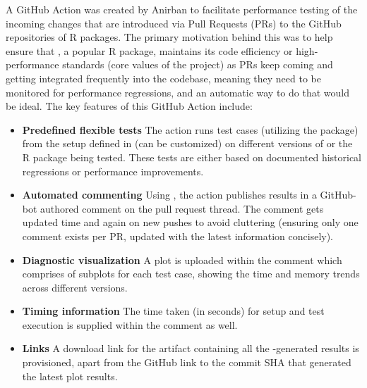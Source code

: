 A GitHub Action was created by Anirban to facilitate performance testing of the incoming changes that are introduced via Pull Requests (PRs) to the GitHub repositories of R packages. The primary motivation behind this was to help ensure that , a popular R package, maintains its code efficiency or high-performance standards (core values of the project) as PRs keep coming and getting integrated frequently into the codebase, meaning they need to be monitored for performance regressions, and an automatic way to do that would be ideal.
\newline
\newline
The key features of this GitHub Action include:
\begin{itemize}
    \item \textbf{Predefined flexible tests} 
    \newline
    The action runs test cases (utilizing the  package) from the setup defined in  (can be customized) on different versions of  or the R package being tested. These tests are either based on documented historical regressions or performance improvements.
    \item \textbf{Automated commenting}
    \newline
    Using , the action publishes results in a GitHub-bot authored comment on the pull request thread. The comment gets updated time and again on new pushes to avoid cluttering (ensuring only one comment exists per PR, updated with the latest information concisely). 
    \item \textbf{Diagnostic visualization}
    \newline
    A plot is uploaded within the comment which comprises of subplots for each test case, showing the time and memory trends across different  versions.
    \item \textbf{Timing information}
    \newline
    The time taken (in seconds) for setup and test execution is supplied within the comment as well.
    \item \textbf{Links}
    \newline
    A download link for the artifact containing all the -generated results is provisioned, apart from the GitHub link to the commit SHA that generated the latest plot results.


\end{itemize}
